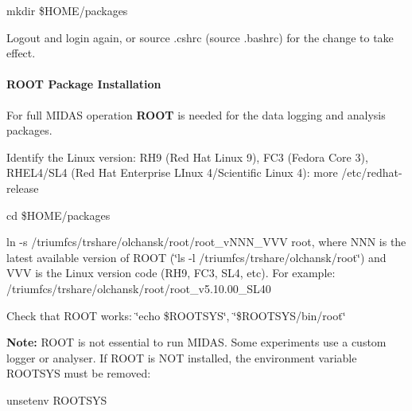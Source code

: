 \begin{DoxyItemize}
\item mkdir \$HOME/packages
\item Logout and login again, or source .cshrc (source .bashrc) for the change to take effect. \par

\end{DoxyItemize}

\label{Q_Linux_idx_ROOT_installation}
\hypertarget{Q_Linux_idx_ROOT_installation}{}
 \hypertarget{Q_Linux_Q_Linux_Root_Installation}{}\paragraph{ROOT Package Installation}\label{Q_Linux_Q_Linux_Root_Installation}
For full MIDAS operation {\bfseries ROOT} is needed for the data logging and analysis packages.


\begin{DoxyItemize}
\item Identify the Linux version: RH9 (Red Hat Linux 9), FC3 (Fedora Core 3), RHEL4/SL4 (Red Hat Enterprise LInux 4/Scientific Linux 4): more /etc/redhat-\/release
\item cd \$HOME/packages
\item ln -\/s /triumfcs/trshare/olchansk/root/root\_\-vNNN\_\-VVV root, where NNN is the latest available version of ROOT (\char`\"{}ls -\/l /triumfcs/trshare/olchansk/root\char`\"{}) and VVV is the Linux version code (RH9, FC3, SL4, etc). For example: /triumfcs/trshare/olchansk/root/root\_\-v5.10.00\_\-SL40
\item Check that ROOT works: \char`\"{}echo \$ROOTSYS\char`\"{}, \char`\"{}\$ROOTSYS/bin/root\char`\"{} \par
 \par
 {\bfseries Note:} ROOT is not essential to run MIDAS. Some experiments use a custom logger or analyser. If ROOT is NOT installed, the environment variable ROOTSYS must be removed: 
\begin{DoxyCode}
      unsetenv ROOTSYS
\end{DoxyCode}

\end{DoxyItemize}

